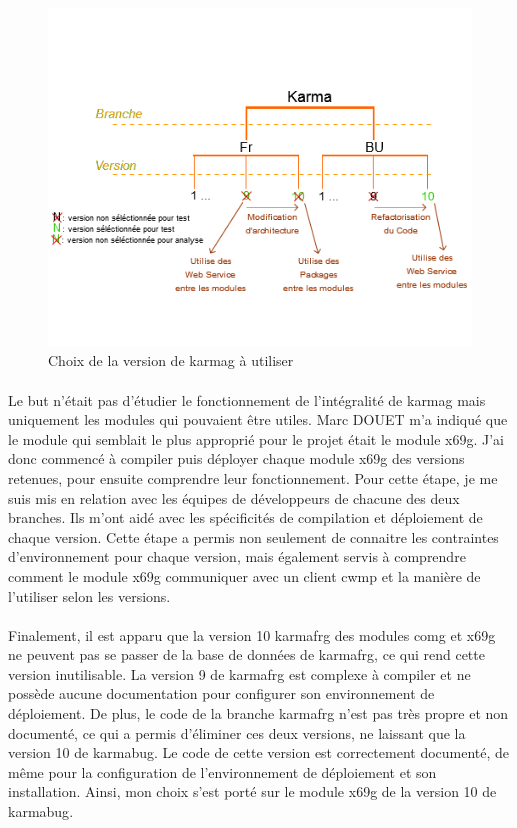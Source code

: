 \documentclass[12pt,a4paper]{report}
\begin{document}
\paragraph*{}
\begin{figure}[!ht]
    \center
    \includegraphics[scale=0.9]{./img/choix_karma.png}
    \caption{Choix de la version de \gls{karmag} à utiliser}
\end{figure}
\paragraph*{}Le but n’était pas d’étudier le fonctionnement de l’intégralité de \gls{karmag} mais uniquement les modules qui pouvaient être utiles. Marc DOUET m’a indiqué que le module qui semblait le plus approprié pour le projet était le module \gls{x69g}. J’ai donc commencé à compiler puis déployer chaque module \gls{x69g} des versions retenues, pour ensuite comprendre leur fonctionnement. Pour cette étape, je me suis mis en relation avec les équipes de développeurs de chacune des deux branches. Ils m’ont aidé avec les spécificités de compilation et déploiement de chaque version. Cette étape a permis non seulement de connaitre les contraintes d’environnement pour chaque version, mais également servis à comprendre comment le module \gls{x69g} communiquer avec un client \gls{cwmp} et la manière de l’utiliser selon les versions.
\paragraph*{} Finalement, il est apparu que la version 10 \gls{karmafrg} des modules \gls{comg} et \gls{x69g} ne peuvent pas se passer de la base de données de \gls{karmafrg}, ce qui rend cette version inutilisable. La version 9 de \gls{karmafrg} est complexe à compiler et ne possède aucune documentation pour configurer son environnement de déploiement. De plus, le code de la branche \gls{karmafrg} n’est pas très propre et non documenté, ce qui a permis d’éliminer ces deux versions, ne laissant que la version 10 de \gls{karmabug}. Le code de cette version est correctement documenté, de même pour la configuration de l’environnement de déploiement et son installation. Ainsi, mon choix s’est porté sur le module \gls{x69g} de la version 10 de \gls{karmabug}. \\
\end{document}
